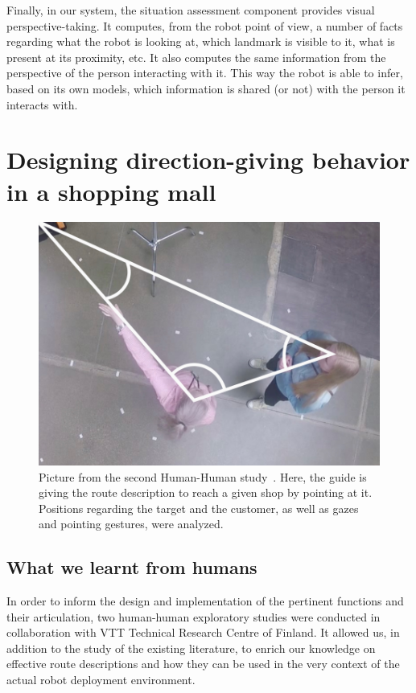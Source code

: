 \documentclass[a4paper,11pt,twoside]{StyleThese}
\begin{document}
Finally, in our system, the situation assessment component provides visual perspective-taking. It computes, from the robot point of view, a number of facts regarding what the robot is looking at, which landmark is visible to it, what is present at its proximity, etc. It also computes the same information from the perspective of the person interacting with it. This way the robot is able to infer, based on its own models, which information is shared (or not) with the person it interacts with.


\section{Designing direction-giving behavior in a shopping mall}
\label{sec:modeling}

\begin{figure}[!t]
	\centering
	\includegraphics[scale=0.5]{figures/chapter3/human_guide.png}
	\caption{\label{fig:chap3_human_guide} Picture from the second Human-Human study~\citep{belhassein_2017_human}. Here, the guide is giving the route description to reach a given shop by pointing at it. Positions regarding the target and the customer, as well as gazes and pointing gestures, were analyzed.}
\end{figure}

\subsection{What we learnt from humans}\label{sec:methodology}
In order to inform the design and implementation of the pertinent functions and their articulation, two human-human exploratory studies were conducted in collaboration with VTT Technical Research Centre of Finland. It allowed us, in addition to the study of the existing literature, to enrich our knowledge on effective route descriptions and how they can be used in the very context of the actual robot deployment environment. 
\end{document}
